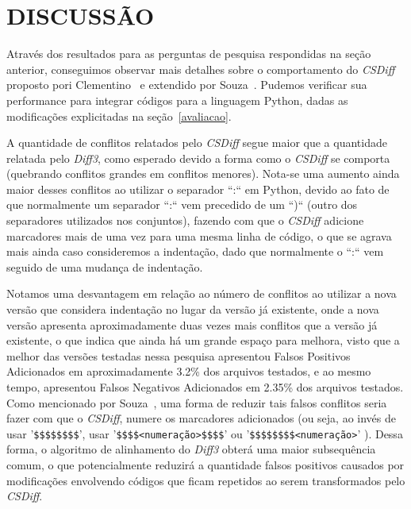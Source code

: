 \section{DISCUSSÃO}\label{discussao}

Através dos resultados para as perguntas de pesquisa respondidas na seção
anterior, conseguimos observar mais detalhes sobre o comportamento do
\emph{CSDiff} proposto pori Clementino~\cite{clem21} e extendido por
Souza~\cite{heitor21}. Pudemos verificar sua performance para integrar códigos
para a linguagem Python, dadas as modificações explicitadas na
seção~\ref{avaliacao}.

A quantidade de conflitos relatados pelo \emph{CSDiff} segue maior que a
quantidade relatada pelo \emph{Diff3}, como esperado devido a forma como o
\emph{CSDiff} se comporta (quebrando conflitos grandes em conflitos menores).
Nota-se uma aumento ainda maior desses conflitos ao utilizar o separador ``:``
em Python, devido ao fato de que normalmente um separador ``:`` vem precedido
de um ``)`` (outro dos separadores utilizados nos conjuntos), fazendo com que o
\emph{CSDiff} adicione marcadores mais de uma vez para uma mesma linha de
código, o que se agrava mais ainda caso consideremos a indentação, dado que
normalmente o ``:`` vem seguido de uma mudança de indentação.

Notamos uma desvantagem em relação ao número de conflitos ao utilizar a nova
versão que considera indentação no lugar da versão já existente, onde a nova
versão apresenta aproximadamente duas vezes mais conflitos que a versão já
existente, o que indica que ainda há um grande espaço para melhora, visto que a
melhor das versões testadas nessa pesquisa apresentou Falsos Positivos
Adicionados em aproximadamente 3.2\% dos arquivos testados, e ao mesmo tempo,
apresentou Falsos Negativos Adicionados em 2.35\% dos arquivos testados. Como
mencionado por Souza~\cite{heitor21}, uma forma de reduzir tais falsos
conflitos seria fazer com que o \emph{CSDiff}, numere os
marcadores adicionados (ou seja, ao invés de usar '\verb|$$$$$$$$|', usar
'\verb|$$$$<numeração>$$$$|' ou '\verb|$$$$$$$$<numeração>|' ). Dessa forma, o
algoritmo de alinhamento do \emph{Diff3} obterá uma maior subsequência comum, o
que potencialmente reduzirá a quantidade falsos positivos causados por
modificações envolvendo códigos que ficam repetidos ao serem transformados pelo
\emph{CSDiff}.

